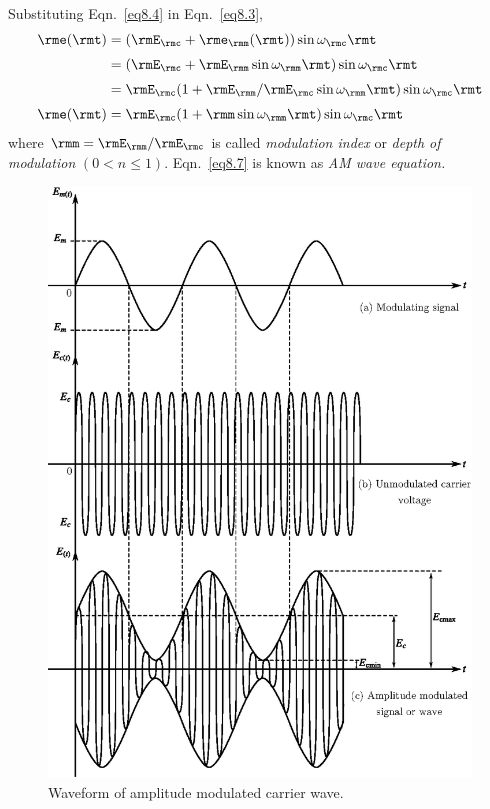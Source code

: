 Substituting Eqn.~\eqref{eq8.4} in Eqn.~\eqref{eq8.3},
\begin{align}
\rme(\rmt) & = (\rmE_\rmc + \rme_\rmm(\rmt)) \sin \omega_\rmc \rmt\label{eq8.5}\\[3pt]
& = (\rmE_\rmc + \rmE_\rmm \sin \omega_\rmm \rmt) \sin \omega_\rmc \rmt \label{eq8.6}\\[3pt]
& = \rmE_\rmc (1+\rmE_\rmm/\rmE_\rmc \sin \omega_\rmm \rmt)  \sin \omega_\rmc \rmt\notag \\[3pt]
\rme(\rmt) & = \rmE_\rmc (1+ \rmm \sin \omega_\rmm\rmt) \sin \omega_\rmc \rmt\label{eq8.7}
\end{align}
where $\rmm=\rmE_\rmm/\rmE_\rmc$ is called \textit{modulation index}
or \textit{depth of modulation} $(0 < n \leq 1)$. Eqn.~\eqref{eq8.7}
is known as \textit{AM wave equation.}
\begin{figure}[H]
\centering
\includegraphics[scale=0.88]{chap8/fig8.2.eps}
\caption{Waveform of amplitude modulated carrier wave.}\label{fig8.2}
\end{figure}

